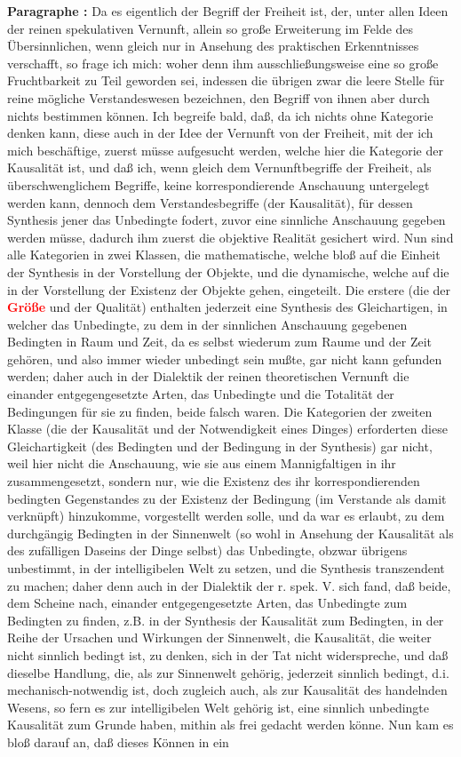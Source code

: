 \documentclass[a4paper,12pt,twoside]{book}
\newcommand{\match}[1]{\textcolor{red}{\textbf{#1}}}
\begin{document}
	\textbf{Paragraphe : }Da es eigentlich der Begriff der Freiheit ist, der, unter allen Ideen der reinen spekulativen Vernunft, allein so große Erweiterung im Felde des Übersinnlichen, wenn gleich nur in Ansehung des praktischen Erkenntnisses verschafft, so frage ich mich: woher denn ihm ausschließungsweise eine so große Fruchtbarkeit zu Teil geworden sei, indessen die übrigen zwar die leere Stelle für reine mögliche Verstandeswesen bezeichnen, den Begriff von ihnen aber durch nichts bestimmen können. Ich begreife bald, daß, da ich nichts ohne Kategorie denken kann, diese auch in der Idee der Vernunft von der Freiheit, mit der ich mich beschäftige, zuerst müsse aufgesucht werden, welche hier die Kategorie der Kausalität ist, und daß ich, wenn gleich dem Vernunftbegriffe der Freiheit, als überschwenglichem Begriffe, keine korrespondierende Anschauung untergelegt werden kann, dennoch dem Verstandesbegriffe (der Kausalität), für dessen Synthesis jener das Unbedingte fodert, zuvor eine sinnliche Anschauung gegeben werden müsse, dadurch ihm zuerst die objektive Realität gesichert wird. Nun sind alle Kategorien in zwei Klassen, die mathematische, welche bloß auf die Einheit der Synthesis in der Vorstellung der Objekte, und die dynamische, welche auf die in der Vorstellung der Existenz der Objekte gehen, eingeteilt. Die erstere (die der \match{Größe} und der Qualität) enthalten jederzeit eine Synthesis des Gleichartigen, in welcher das Unbedingte, zu dem in der sinnlichen Anschauung gegebenen Bedingten in Raum und Zeit, da es selbst wiederum zum Raume und der Zeit gehören, und also  immer wieder unbedingt sein mußte, gar nicht kann gefunden werden; daher auch in der Dialektik der reinen theoretischen Vernunft die einander entgegengesetzte Arten, das Unbedingte und die Totalität der Bedingungen für sie zu finden, beide falsch waren. Die Kategorien der zweiten Klasse (die der Kausalität und der Notwendigkeit eines Dinges) erforderten diese Gleichartigkeit (des Bedingten und der Bedingung in der Synthesis) gar nicht, weil hier nicht die Anschauung, wie sie aus einem Mannigfaltigen in ihr zusammengesetzt, sondern nur, wie die Existenz des ihr korrespondierenden bedingten Gegenstandes zu der Existenz der Bedingung (im Verstande als damit verknüpft) hinzukomme, vorgestellt werden solle, und da war es erlaubt, zu dem durchgängig Bedingten in der Sinnenwelt (so wohl in Ansehung der Kausalität als des zufälligen Daseins der Dinge selbst) das Unbedingte, obzwar übrigens unbestimmt, in der intelligibelen Welt zu setzen, und die Synthesis transzendent zu machen; daher denn auch in der Dialektik der r. spek. V. sich fand, daß beide, dem Scheine nach, einander entgegengesetzte Arten, das Unbedingte zum Bedingten zu finden, z.B. in der Synthesis der Kausalität zum Bedingten, in der Reihe der Ursachen und Wirkungen der Sinnenwelt, die Kausalität, die weiter nicht sinnlich bedingt ist, zu denken, sich in der Tat nicht widerspreche, und daß dieselbe Handlung, die, als zur Sinnenwelt gehörig, jederzeit sinnlich bedingt, d.i. mechanisch-notwendig ist, doch zugleich auch, als zur Kausalität des handelnden Wesens, so fern es zur intelligibelen Welt gehörig ist, eine sinnlich unbedingte Kausalität zum Grunde haben, mithin als frei gedacht werden könne. Nun kam es bloß darauf an, daß dieses Können in ein 
\end{document}
